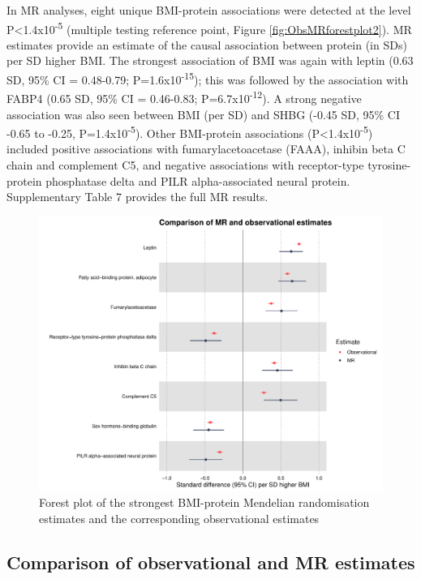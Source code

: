 \documentclass[11pt,twoside]{bristolthesis}
\begin{document}
In MR analyses, eight unique BMI-protein associations were detected at the level P\textless1.4x10\textsuperscript{-5} (multiple testing reference point, Figure \ref{fig:ObsMRforestplot2}). MR estimates provide an estimate of the causal association between protein (in SDs) per SD higher BMI. The strongest association of BMI was again with leptin (0.63 SD, 95\% CI = 0.48-0.79; P=1.6x10\textsuperscript{-15}); this was followed by the association with FABP4 (0.65 SD, 95\% CI = 0.46-0.83; P=6.7x10\textsuperscript{-12}). A strong negative association was also seen between BMI (per SD) and SHBG (-0.45 SD, 95\% CI -0.65 to -0.25, P=1.4x10\textsuperscript{-5}). Other BMI-protein associations (P\textless1.4x10\textsuperscript{-5}) included positive associations with fumarylacetoacetase (FAAA), inhibin beta C chain and complement C5, and negative associations with receptor-type tyrosine-protein phosphatase delta and PILR alpha-associated neural protein. Supplementary Table 7 provides the full MR results.
\begin{figure}
\includegraphics[width=0.95\linewidth]{figure/BMI_protein_INTERVAL/MR_obs_compar_forestplot} \caption{Forest plot of the strongest BMI-protein Mendelian randomisation estimates and the corresponding observational estimates}\label{fig:ObsMRforesplot2}
\end{figure}
\hypertarget{comparison-of-observational-and-mr-estimates}{%
\subsection{Comparison of observational and MR estimates}\label{comparison-of-observational-and-mr-estimates}}
\end{document}
